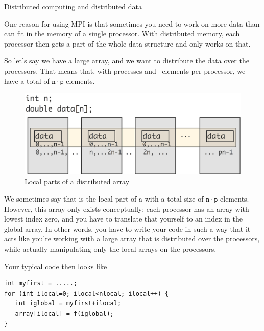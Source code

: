 
 {Distributed computing and distributed data}

One reason for using MPI is that sometimes you need to work on
more data than can fit in the memory of a single processor.
With distributed memory, each processor then gets a part
of the whole data structure and only works on that.

So let's say we have a large array, and we want to
distribute the data over the processors.
That means that, with  processes and ~elements
per processor, we have a total of $\mathtt{n}\cdot\mathtt{p}$
elements.

\begin{figure}[ht]
  \includegraphics[scale=.1]{graphics/mpi-array}
  \caption{Local parts of a distributed array}
  \label{fig:mpi-array}
\end{figure}

We sometimes say that  is the local part
of a  with a total size of
$\mathtt{n}\cdot\mathtt{p}$
elements.
However, this array only exists
conceptually: each processor has an array with lowest index zero,
and you have to translate that yourself to an index in the global
array.
In other words, you have to write your code in such a way that
it acts like you're working with a large array that is distributed
over the processors, while
actually manipulating only the local arrays on the processors.

Your typical code then looks like

\lstset{style=reviewcode,language=C} %
\begin{lstlisting}
int myfirst = .....;
for (int ilocal=0; ilocal<nlocal; ilocal++) {
   int iglobal = myfirst+ilocal;
   array[ilocal] = f(iglobal);
}
\end{lstlisting}

